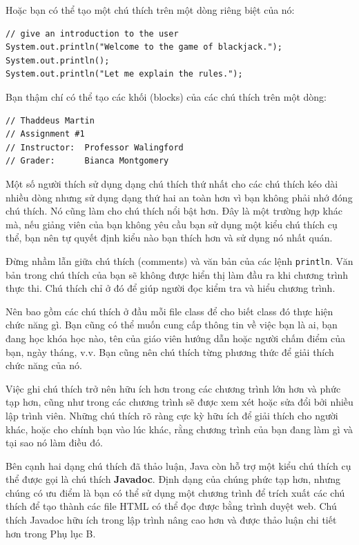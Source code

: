 Hoặc bạn có thể tạo một chú thích trên một dòng riêng biệt của nó:

\begin{verbatim}
// give an introduction to the user
System.out.println("Welcome to the game of blackjack.");
System.out.println();
System.out.println("Let me explain the rules.");
\end{verbatim}

Bạn thậm chí có thể tạo các khối (blocks) của các chú thích trên một
dòng:

\begin{verbatim}
// Thaddeus Martin
// Assignment #1
// Instructor:  Professor Walingford
// Grader:      Bianca Montgomery
\end{verbatim}

Một số người thích sử dụng dạng chú thích thứ nhất cho các chú thích kéo
dài nhiều dòng nhưng sử dụng dạng thứ hai an toàn hơn vì bạn không phải
nhớ đóng chú thích. Nó cũng làm cho chú thích nổi bật hơn. Đây là một
trường hợp khác mà, nếu giảng viên của bạn không yêu cầu bạn sử dụng một
kiểu chú thích cụ thể, bạn nên tự quyết định kiểu nào bạn thích hơn và
sử dụng nó nhất quán.

Đừng nhầm lẫn giữa chú thích (comments) và văn bản của các lệnh
\texttt{println}. Văn bản trong chú thích của bạn sẽ không được hiển thị
làm đầu ra khi chương trình thực thi. Chú thích chỉ ở đó để giúp người
đọc kiểm tra và hiểu chương trình.

Nên bao gồm các chú thích ở đầu mỗi file class để cho biết class đó thực
hiện chức năng gì. Bạn cũng có thể muốn cung cấp thông tin về việc bạn
là ai, bạn đang học khóa học nào, tên của giáo viên hướng dẫn hoặc người
chấm điểm của bạn, ngày tháng, v.v. Bạn cũng nên chú thích từng phương
thức để giải thích chức năng của nó.

Việc ghi chú thích trở nên hữu ích hơn trong các chương trình lớn hơn và
phức tạp hơn, cũng như trong các chương trình sẽ được xem xét hoặc sửa
đổi bởi nhiều lập trình viên. Những chú thích rõ ràng cực kỳ hữu ích để
giải thích cho người khác, hoặc cho chính bạn vào lúc khác, rằng chương
trình của bạn đang làm gì và tại sao nó làm điều đó.

Bên cạnh hai dạng chú thích đã thảo luận, Java còn hỗ trợ một kiểu chú
thích cụ thể được gọi là chú thích \textbf{Javadoc}. Định dạng của chúng
phức tạp hơn, nhưng chúng có ưu điểm là bạn có thể sử dụng một chương
trình để trích xuất các chú thích để tạo thành các file HTML có thể đọc
được bằng trình duyệt web. Chú thích Javadoc hữu ích trong lập trình
nâng cao hơn và được thảo luận chi tiết hơn trong Phụ lục B.


